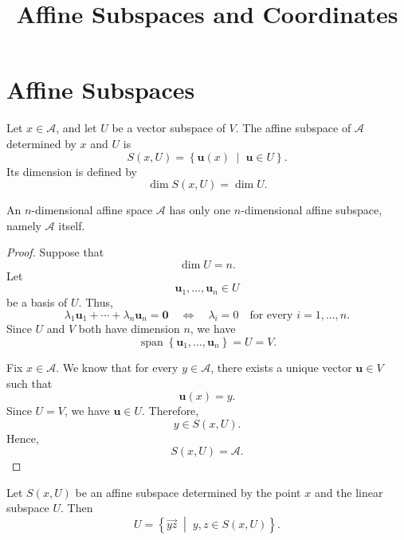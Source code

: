 \documentclass[12pt]{article}
\title{Affine Subspaces and Coordinates}
\author{}
\date{}
\begin{document}
\maketitle

\section{Affine Subspaces}

\begin{definition}
Let \(x\in \mathcal A\), and let \(U\) be a vector subspace of \(V\). The affine
subspace of \(\mathcal A\) determined by \(x\) and \(U\) is
\[
S(x,U)
=
\left\{
\mathbf{u}(x)
\;\middle|\;
\mathbf{u}\in U
\right\}.
\]
Its dimension is defined by
\[
\dim S(x,U)=\dim U.
\]
\end{definition}

\begin{proposition}
An \(n\)-dimensional affine space \(\mathcal A\) has only one \(n\)-dimensional
affine subspace, namely \(\mathcal A\) itself.
\end{proposition}

\begin{proof}
Suppose that
\[
\dim U=n.
\]
Let
\[
\mathbf{u}_1,\ldots,\mathbf{u}_n\in U
\]
be a basis of \(U\). Thus,
\[
\lambda_1\mathbf{u}_1+\cdots+\lambda_n\mathbf{u}_n=\mathbf{0}
\quad\Longleftrightarrow\quad
\lambda_i=0
\quad\text{for every }i=1,\ldots,n.
\]
Since \(U\) and \(V\) both have dimension \(n\), we have
\[
\operatorname{span}
\left\{
\mathbf{u}_1,\ldots,\mathbf{u}_n
\right\}
=
U
=
V.
\]

Fix \(x\in \mathcal A\). We know that for every \(y\in \mathcal A\), there exists a unique
vector \(\mathbf{u}\in V\) such that
\[
\mathbf{u}(x)=y.
\]
Since \(U=V\), we have \(\mathbf{u}\in U\). Therefore,
\[
y\in S(x,U).
\]
Hence,
\[
S(x,U)=\mathcal A.
\]
\end{proof}

\begin{proposition}
Let \(S(x,U)\) be an affine subspace determined by the point \(x\) and
the linear subspace \(U\). Then
\[
U
=
\left\{
\overrightarrow{yz}
\;\middle|\;
y,z\in S(x,U)
\right\}.
\]
\end{proposition}
\end{document}
